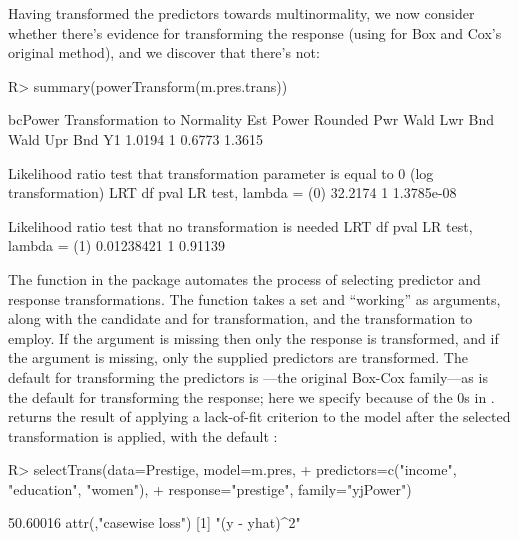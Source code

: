 \documentclass[
]{jss}
\begin{document}
Having transformed the predictors towards multinormality, we now
consider whether there's evidence for transforming the response (using
 for Box and Cox's original method), and we
discover that there's not:

\begin{CodeChunk}
\begin{CodeInput}
R> summary(powerTransform(m.pres.trans))
\end{CodeInput}
\begin{CodeOutput}
bcPower Transformation to Normality 
   Est Power Rounded Pwr Wald Lwr Bnd Wald Upr Bnd
Y1    1.0194           1       0.6773       1.3615

Likelihood ratio test that transformation parameter is equal to 0
 (log transformation)
                          LRT df       pval
LR test, lambda = (0) 32.2174  1 1.3785e-08

Likelihood ratio test that no transformation is needed
                             LRT df    pval
LR test, lambda = (1) 0.01238421  1 0.91139
\end{CodeOutput}
\end{CodeChunk}

The  function in the  package automates the
process of selecting predictor and response transformations. The
function takes a  set and ``working''  as
arguments, along with the candidate  and
 for transformation, and the transformation 
to employ. If the  argument is missing then only the
response is transformed, and if the  argument is missing,
only the supplied predictors are transformed. The default 
for transforming the predictors is ---the original
Box-Cox family---as is the default  for transforming the
response; here we specify  because of the 0s in
.  returns the result of applying a
lack-of-fit criterion to the model after the selected transformation is
applied, with the default :

\begin{CodeChunk}
\begin{CodeInput}
R> selectTrans(data=Prestige, model=m.pres,
+             predictors=c("income", "education", "women"),
+             response="prestige", family="yjPower")
\end{CodeInput}
\begin{CodeOutput}
[1] 50.60016
attr(,"casewise loss")
[1] "(y - yhat)^2"
\end{CodeOutput}
\end{CodeChunk}
\end{document}
